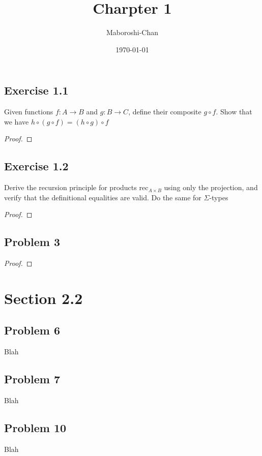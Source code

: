 \documentclass{article}
\title{Charpter 1}
\author{Maboroshi-Chan}
\date\today
\begin{document}
\maketitle %


\subsection*{Exercise 1.1}
Given functions $f : A\to B$ and $g : B\to C$, define their composite
$g \circ f$. Show that we have $h\circ(g\circ f) = (h\circ g)\circ f$
\begin{proof}

\end{proof}

\subsection*{Exercise 1.2}
Derive the recursion principle for products $\mathrm{rec}_{A\times B}$
using only the projection, and verify that the definitional equalities
are valid.
Do the same for $\Sigma$-types
\begin{proof}

\end{proof}

\subsection*{Problem 3}
%
\begin{proof}
%
\end{proof}

\section*{Section 2.2}
%
\subsection*{Problem 6}
Blah
\subsection*{Problem 7}
Blah
\subsection*{Problem 10}
Blah
\end{document}

